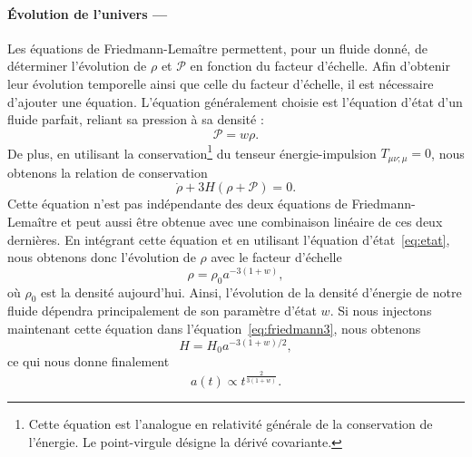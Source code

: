 \documentclass[11pt, twoside, a4paper, openright]{report}
\begin{document}
\paragraph{Évolution de l'univers —}
Les équations de Friedmann-Lemaître permettent, pour un fluide donné, de déterminer l'évolution de $\rho$ et $\mathcal{P}$ en fonction du facteur d'échelle. Afin d'obtenir leur évolution temporelle ainsi que celle du facteur d'échelle, il est nécessaire d'ajouter une équation. L'équation généralement choisie est l'équation d'état d'un fluide parfait, reliant sa pression à sa densité :
\begin{equation}
  \label{eq:etat}
  \mathcal{P} = w \rho .
\end{equation}
De plus, en utilisant la conservation\footnote{Cette équation est l'analogue en relativité générale de la conservation de l'énergie. Le point-virgule désigne la dérivé covariante.} du tenseur énergie-impulsion $T_{\mu \nu ; \mu} = 0$, nous obtenons la relation de conservation
\begin{equation}
  \label{eq:conservation}
  \dot{\rho} + 3 H (\rho + \mathcal{P}) = 0 .
\end{equation}
Cette équation n'est pas indépendante des deux équations de Friedmann-Lemaître et peut aussi être obtenue avec une combinaison linéaire de ces deux dernières. En intégrant cette équation et en utilisant l'équation d'état~\ref{eq:etat}, nous obtenons donc l'évolution de $\rho$ avec le facteur d'échelle
\begin{equation}
  \label{eq:rho_vs_a}
  \rho = \rho_0 a^{-3(1+w)} ,
\end{equation}
où $\rho_0$ est la densité aujourd'hui. Ainsi, l'évolution de la densité d'énergie de notre fluide dépendra principalement de son paramètre d'état $w$. Si nous injectons maintenant cette équation dans l'équation~\ref{eq:friedmann3}, nous obtenons
\begin{equation}
  \label{eq:H_evol}
  H = H_0 a^{-3 (1+w) / 2} ,
\end{equation}
ce qui nous donne finalement
\begin{equation}
  \label{eq:a_vs_t}
  a(t) \propto t^{\frac{2}{3(1+w)}} .
\end{equation}
\end{document}
